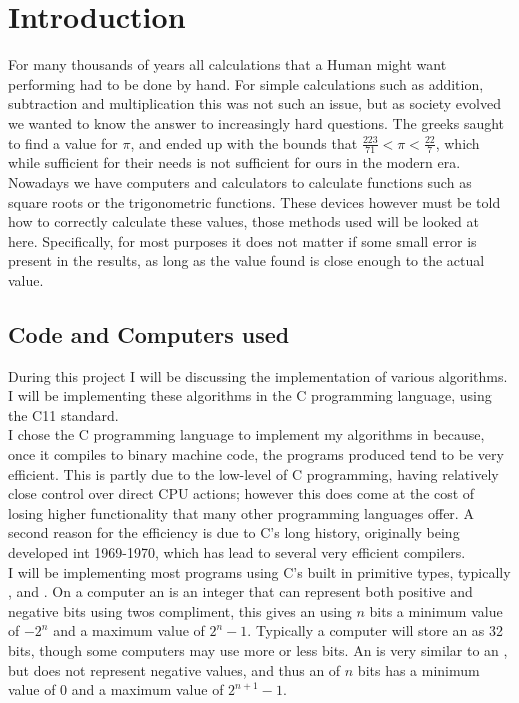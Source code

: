 \section{Introduction}
\label{SEC_"Introduction"}
For many thousands of years all calculations that a Human might want performing had to be done by hand. For simple calculations such as addition, subtraction and multiplication this was not such an issue, but as society evolved we wanted to know the answer to increasingly hard questions. The greeks saught to find a value for $\pi$, and ended up with the bounds that $\frac{223}{71} < \pi < \frac{22}{7}$, which while sufficient for their needs is not sufficient for ours in the modern era. \\

Nowadays we have computers and calculators to calculate functions such as square roots or the trigonometric functions. These devices however must be told how to correctly calculate these values, those methods used will be looked at here. Specifically, for most purposes it does not matter if some small error is present in the results, as long as the value found is close enough to the actual value.\\

\subsection{Code and Computers used}
\label{SUB_"Code and Computers used}
During this project I will be discussing the implementation of various algorithms. I will be implementing these algorithms in the C programming language, using the C11 standard.\\

I chose the C programming language to implement my algorithms in because, once it compiles to binary machine code, the programs produced tend to be very efficient. This is partly due to the low-level of C programming, having relatively close control over direct CPU actions; however this does come at the cost of losing higher functionality that many other programming languages offer. A second reason for the efficiency is due to C's long history, originally being developed int 1969-1970, which has lead to several very efficient compilers.\\

I will be implementing most programs using C's built in primitive types, typically ,  and . On a computer an  is an integer that can represent both positive and negative bits using twos compliment, this gives an  using \(n\) bits a minimum value of \(-2^n\) and a maximum value of \(2^n-1\). Typically a computer will store an  as 32 bits, though some computers may use more or less bits. An  is very similar to an , but does not represent negative values, and thus an  of \(n\) bits has a minimum value of \(0\) and a maximum value of \(2^{n+1}-1\).\\

